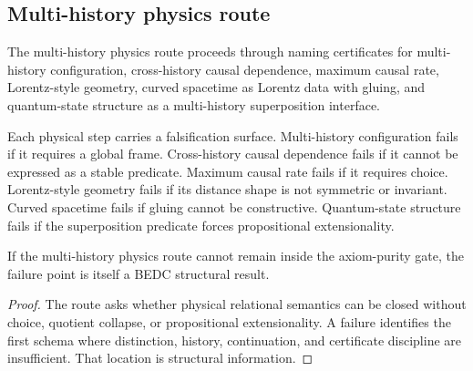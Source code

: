 \subsection{Multi-history physics route}
\label{subsec:philosophy-programme-multihist-physics}

\begin{definition}
\label{def:philosophy-programme-multihist-physics-chain}
The multi-history physics route proceeds through naming certificates
for multi-history configuration, cross-history causal dependence,
maximum causal rate, Lorentz-style geometry, curved spacetime as
Lorentz data with gluing, and quantum-state structure as a
multi-history superposition interface.
\end{definition}



\begin{definition}
\label{def:philosophy-programme-physics-falsification}
Each physical step carries a falsification surface. Multi-history
configuration fails if it requires a global frame. Cross-history causal
dependence fails if it cannot be expressed as a stable predicate.
Maximum causal rate fails if it requires choice. Lorentz-style
geometry fails if its distance shape is not symmetric or invariant.
Curved spacetime fails if gluing cannot be constructive. Quantum-state
structure fails if the superposition predicate forces propositional
extensionality.
\end{definition}


\begin{theorem}
\label{thm:philosophy-programme-physics-failure-structural}
If the multi-history physics route cannot remain inside the
axiom-purity gate, the failure point is itself a BEDC structural
result.
\end{theorem}
\begin{proof}
The route asks whether physical relational semantics can be closed
without choice, quotient collapse, or propositional extensionality. A
failure identifies the first schema where distinction, history,
continuation, and certificate discipline are insufficient. That
location is structural information.
\end{proof}

